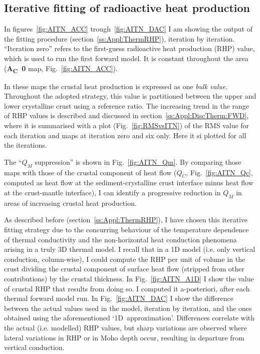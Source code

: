 \begin{subappendices}
\FloatBarrier

\subsection{Iterative fitting of radioactive heat production}
\label{ss:ApplSup:MethodTests:ItFit}
In figures~\ref{fig:AITN_ACC} trough~\ref{fig:AITN_DAC} I am showing the output of the fitting procedure (section~\ref{ss:Appl:ThermRHP}), iteration by iteration.
``Iteration zero'' refers to the first-guess radioactive heat production (RHP) value, which is used to run the first forward model.
It is constant throughout the area (\textbf{A\textsubscript{C}~0} map, Fig.~\ref{fig:AITN_ACC}).

In these maps the crustal heat production is expressed as one \textit{bulk value}.
Throughout the adopted strategy, this value is partitioned between the upper and lower crystalline crust using a reference ratio.
The increasing trend in the range of RHP values is described and discussed in section~\ref{ss:Appl:DiscTherm:FWD}, where it is summarised with a plot (Fig.~\ref{fig:RMSvsITN}) of the RMS value for each iteration and maps at iteration zero and six only.
Here it si plotted for all the iterations.

The ``$Q_M$ suppression'' is shown in Fig.~\ref{fig:AITN_Qm}.
By comparing those maps with those of the crustal component of heat flow ($Q_C$, Fig.~\ref{fig:AITN_Qc}, computed as heat flow at the sediment-crystalline crust interface minus heat flow at the crust-mantle interface), I can identify a progressive reduction in $Q_M$ in areas of increasing crustal heat production.

As described before (section~\ref{ss:Appl:ThermRHP}), I have chosen this iterative fitting strategy due to the concurring behaviour of the temperature dependence of thermal conductivity and the non-horizontal heat conduction phenomena arising in a truly 3D thermal model.
I recall that in a 1D model (i.e. only vertical conduction, column-wise), I could compute the RHP per unit of volume in the crust dividing the crustal component of surface heat flow (stripped from other contributions) by the crustal thickness.
In Fig.~\ref{fig:AITN_A1D} I show the value of crustal RHP that results from doing so.
I computed it a-posteriori, after each thermal forward model run.
In Fig.~\ref{fig:AITN_DAC} I show the difference between the actual values used in the model, iteration by iteration, and the ones obtained using the aforementioned `1D~approximation'.
Differences correlate with the actual (i.e. modelled) RHP values, but sharp variations are observed where lateral variations in RHP or in Moho depth occur, resulting in departure from vertical conduction.


\end{subappendices}
